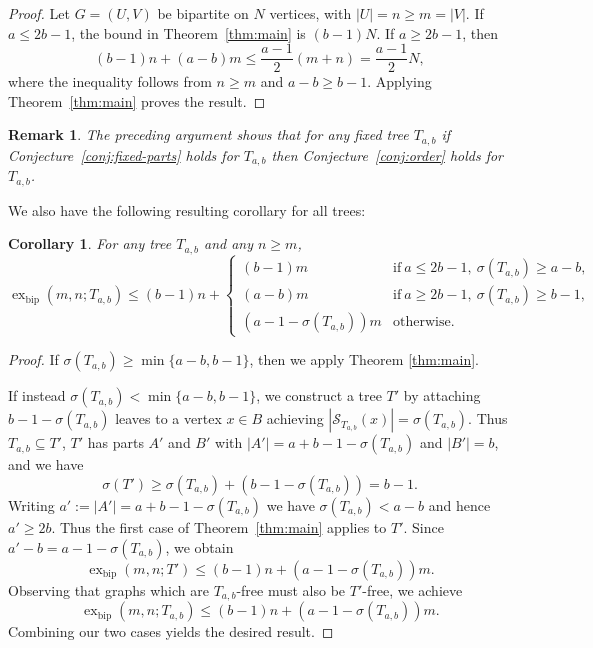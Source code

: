 \documentclass[10pt,a4paper]{amsart}
\newtheorem{corollary}[theorem]{Corollary}
\newtheorem{remark}[theorem]{Remark}
\newcommand{\exbip}{\operatorname{ex}_{\mathrm{bip}}}
\begin{document}
\begin{proof}
Let $G=(U,V)$ be bipartite on $N$ vertices, with $|U|=n\ge m=|V|$. If $a\le 2b-1$, the bound in Theorem~\ref{thm:main} is $(b-1)N$. If $a\ge 2b-1$, then
\[
(b-1)n+(a-b)m\le \frac{a-1}{2}(m+n)=\frac{a-1}{2}N,
\]
where the inequality follows from $n\ge m$ and $a-b\ge b-1$. Applying Theorem~\ref{thm:main} proves the result.
\end{proof}

\begin{remark}
\label{rmk:fixed-implies-order}
    The preceding argument shows that for any fixed tree $T_{a,b}$ if Conjecture~\ref{conj:fixed-parts} holds for $T_{a,b}$ then Conjecture~\ref{conj:order} holds for $T_{a,b}$.
\end{remark}

\noindent We also have the following resulting corollary for all trees:
\begin{corollary}
\label{cor:weak-general}
For any tree $T_{a,b}$ and any $n\geq m$,
\[
    \exbip(m,n;T_{a,b})\le(b-1)n+\begin{cases}
    (b-1)m&\text{if}\ a\leq2b-1,\ \sigma(T_{a,b})\geq a-b,\\
    (a-b)m&\text{if}\ a\geq2b-1,\ \sigma(T_{a,b})\geq b-1,\\
    (a-1-\sigma(T_{a,b}))m&\text{otherwise}.
    \end{cases}
\]
\end{corollary}
\begin{proof}
    If $\sigma(T_{a,b})\geq\min\{a-b,b-1\}$, then we apply Theorem \ref{thm:main}. 
    
    \noindent If instead $\sigma(T_{a,b})<\min\{a-b,b-1\}$, we construct a tree $T'$ by attaching $b-1-\sigma(T_{a,b})$ leaves to a vertex $x\in B$ achieving $|\mathcal S_{T_{a,b}}(x)|=\sigma(T_{a,b})$. Thus $T_{a,b}\subseteq T'$, $T'$ has parts $A'$ and $B'$ with $|A'|=a+b-1-\sigma(T_{a,b})$ and $|B'|=b$, and we have
    \[
    \sigma(T')\geq\sigma(T_{a,b})+(b-1-\sigma(T_{a,b}))=b-1.
    \]
    Writing $a':=|A'|=a+b-1-\sigma(T_{a,b})$ we have $\sigma(T_{a,b})<a-b$ and hence $a'\geq 2b$. Thus the first case of Theorem~\ref{thm:main} applies to $T'$. Since $a'-b=a-1-\sigma(T_{a,b})$, we obtain
    \[
    \exbip(m,n;T')\leq(b-1)n+(a-1-\sigma(T_{a,b}))m.
    \]
    Observing that graphs which are $T_{a,b}$-free must also be $T'$-free, we achieve
    \[
    \exbip(m,n;T_{a,b})\leq(b-1)n+(a-1-\sigma(T_{a,b}))m.
    \]
    Combining our two cases yields the desired result.
\end{proof}
\end{document}
